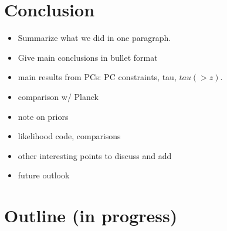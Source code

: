\documentclass[prd,twocolumn,amsmath,amssymb,floatfix,superscriptaddress,nofootinbib]{revtex4-1}
\begin{document}
\section{Conclusion}
\label{sec:conclusion}

\begin{itemize}
    \item Summarize what we did in one paragraph.
    \item Give main conclusions in bullet format
    \item main results from PCs: PC constraints, tau, $tau(>z)$.  
    \item comparison w/ Planck 
    \item note on priors
    \item likelihood code, comparisons
    \item other interesting points to discuss and add 
    \item future outlook
\end{itemize}



\appendix

\section{Outline (in progress)}
\end{document}

